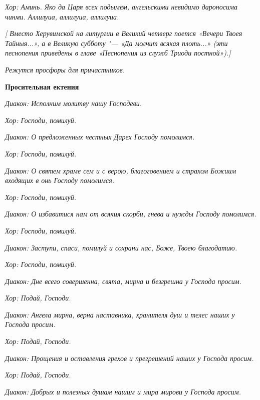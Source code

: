 \itshape Хор:\normalfont{} Аминь. Яко да Царя всех подымем, ангельскими невидимо дароносима чинми. Аллилуиа, аллилуиа, аллилуиа.


\itshape [ Вместо Херувимской на литургии в Великий четверг поется\normalfont{} «Вечери Твоея Тайныя...», \itshape а в Великую субботу "---\normalfont{} «Да молчит всякая плоть...» \itshape (эти песнопения приведены в главе «Песнопения из служб Триоди постной»).]\normalfont{}


\itshape Режутся просфоры для причастников\normalfont{}.





\bfseries Просительная ектения\normalfont{}


\itshape Диакон:\normalfont{} Исполним молитву нашу Господеви.


\itshape Хор:\normalfont{} Господи, помилуй.


\itshape Диакон:\normalfont{} О предложенных честных Дарех Господу помолимся.


\itshape Хор:\normalfont{} Господи, помилуй.


\itshape Диакон:\normalfont{} О святем храме сем и с верою, благоговением и страхом Божиим входящих в онь Господу помолимся.


\itshape Хор:\normalfont{} Господи, помилуй.


\itshape Диакон:\normalfont{} О избавитися нам от всякия скорби, гнева и нужды Господу помолимся.


\itshape Хор:\normalfont{} Господи, помилуй.


\itshape Диакон:\normalfont{} Заступи, спаси, помилуй и сохрани нас, Боже, Твоею благодатию.


\itshape Хор:\normalfont{} Господи, помилуй.


\itshape Диакон:\normalfont{} Дне всего совершенна, свята, мирна и безгрешна у Господа просим.


\itshape Хор:\normalfont{} Подай, Господи.


\itshape Диакон:\normalfont{} Ангела мирна, верна наставника, хранителя душ и телес наших у Господа просим.


\itshape Хор:\normalfont{} Подай, Господи.


\itshape Диакон:\normalfont{} Прощения и оставления грехов и прегрешений наших у Господа просим.


\itshape Хор:\normalfont{} Подай, Господи.


\itshape Диакон:\normalfont{} Добрых и полезных душам нашим и мира мирови у Господа просим.


